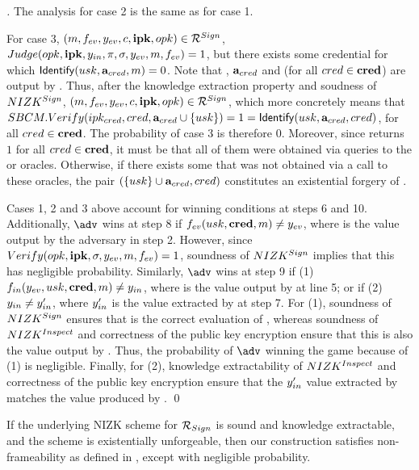\begin{proof}[]
  The analysis for case 2 is the same as for case 1.

  For case 3, $(m,f_{ev},y_{ev},c,\mathbf{ipk},opk) \in \mathcal{R}^{Sign}$,
  $Judge(opk,\mathbf{ipk},y_{in},\pi,\sigma,y_{ev},m,f_{ev})
  = 1$, but there exists some credential \cred for which $\mathsf{Identify}(usk,
  \mathbf{a}_{cred},m)=0$. Note that \usk, $\mathbf{a}_{cred}$ and \cred (for all
  $cred \in \mathbf{cred}$) are output by \ExtractSign. Thus, after the knowledge
  extraction property and soudness of $NIZK^{Sign}$, $(m,f_{ev},y_{ev},c,
  \mathbf{ipk},opk) \in \mathcal{R}^{Sign}$, which more concretely means that
  $SBCM.Verify(ipk_{cred},cred,\mathbf{a}_{cred} \cup \lbrace usk \rbrace) = 1
  = \mathsf{Identify}(usk,\mathbf{a}_{cred},cred)$, for all $cred \in \mathbf{cred}$. The
  probability of case 3 is therefore $0$.
  Moreover, since \SBCMVerify returns $1$ for all $cred \in \mathbf{cred}$, it must
  be that all of them were obtained via queries to the \ISSUE or \OBTISS
  oracles. Otherwise, if there exists some \cred that was not obtained via
  a call to these oracles, the pair $(\lbrace usk \rbrace \cup \mathbf{a}_{cred},
  cred)$ constitutes an existential forgery of \SBCM.

  Cases 1, 2 and 3 above account for winning conditions at steps 6 and 10.
  Additionally, $\adv$ wins at step 8 if $f_{ev}(usk,\mathbf{cred},m) \neq y_{ev}$,
  where \yeval is the value output by the adversary in step 2. However, since
  $Verify(opk,\mathbf{ipk},\sigma,y_{ev},m,f_{ev}) = 1$, soundness of $NIZK^{Sign}$
  implies that this has negligible probability.
  Similarly, $\adv$ wins at step 9 if (1) $f_{in}(y_{ev},usk,\mathbf{cred},m) \neq
  y_{in}$, where \yinsp is the value output by \Inspect at line 5; or if (2)
  $y_{in} \neq y_{in}'$, where $y_{in}'$ is the value extracted by \ExtractSign
  at step 7. For (1), soundness of $NIZK^{Sign}$ ensures that \yinsp is the
  correct evaluation of \finsp, whereas soundness of $NIZK^{Inspect}$ and
  correctness of the public key encryption ensure that this is also the value
  output by \Inspect. Thus, the probability of $\adv$ winning the game because
  of (1) is negligible. Finally, for (2), knowledge extractability of
  $NIZK^{Inspect}$ and correctness of the public key encryption ensure that
  the $y_{in}'$ value extracted by \NIZKExtII matches the value produced by
  \Inspect.
  \qed
\end{proof}

\begin{theorem}
  \label{thm:frame-uas}
  If the underlying NIZK scheme for $\mathcal{R}_{Sign}$ is sound and knowledge
  extractable, and the \SBCM scheme is existentially unforgeable, then our
  \CUASGen construction satisfies non-frameability as defined in
  , except with negligible probability.  
\end{theorem}


